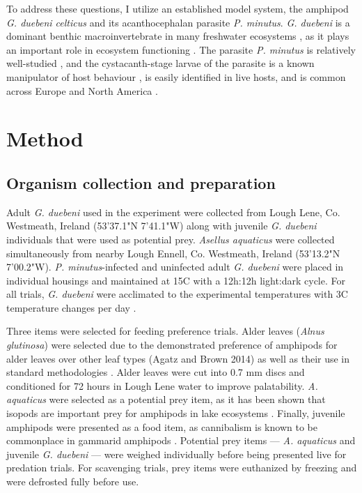 To address these questions, I utilize an established model system, the amphipod \emph{G. duebeni celticus} and its acanthocephalan parasite \emph{P. minutus}. \emph{G. duebeni} is a dominant benthic macroinvertebrate in many freshwater ecosystems \citep{mortensen1982, kelly2006}, as it plays an important role in ecosystem functioning \citep{macneil1997, sutcliffe2000}. The parasite \emph{P. minutus} is relatively well-studied \citep{dezfuli1999, bailly2017}, and the cystacanth-stage larvae of the parasite is a known manipulator of host behaviour \citep{jacquin2014}, is easily identified in live hosts, and is common across Europe and North America \citep{vancleave1951}. 


\section{Method}

\subsection{Organism collection and preparation}

Adult \emph{G. duebeni} used in the experiment were collected from Lough Lene, Co. Westmeath, Ireland (53'37.1"N 7'41.1"W) along with juvenile \emph{G. duebeni} individuals that were used as potential prey. \emph{Asellus aquaticus} were collected simultaneously from nearby Lough Ennell, Co. Westmeath, Ireland (53'13.2"N 7'00.2"W). \emph{P. minutus}-infected and uninfected adult \emph{G. duebeni} were placed in individual housings and maintained at 15\degree C  with a 12h:12h light:dark cycle. For all trials, \emph{G. duebeni} were acclimated to the experimental temperatures with 3\degree C  temperature changes per day \citep{penk2016}.

Three items were selected for feeding preference trials. Alder leaves (\emph{Alnus glutinosa}) were selected due to the demonstrated preference of amphipods for alder leaves over other leaf types (Agatz and Brown 2014) as well as their use in standard methodologies \citep{little2018}. Alder leaves were cut into 0.7 mm discs and conditioned for 72 hours in Lough Lene water to improve palatability. \emph{A. aquaticus} were selected as a potential prey item, as it has been shown that isopods are important prey for amphipods in lake ecosystems \citep{macneil1997}. Finally, juvenile amphipods were presented as a food item, as cannibalism is known to be commonplace in gammarid amphipods \citep{dick1993}.  Potential prey items --- \emph{A. aquaticus} and juvenile \emph{G. duebeni} --- were weighed individually before being presented live for predation trials. For scavenging trials, prey items were euthanized by freezing and were defrosted fully before use. 

